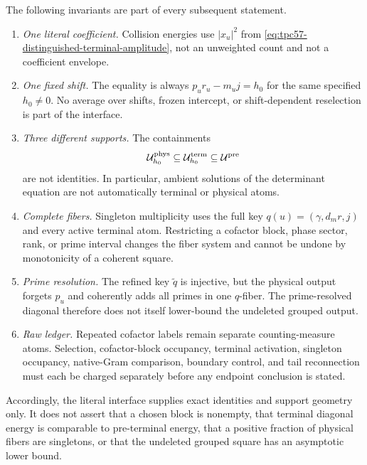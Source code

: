The following invariants are part of every subsequent statement.
\begin{enumerate}[label=\textup{(I\arabic*)},leftmargin=3.2em]
 \item \emph{One literal coefficient.}
       Collision energies use \(|x_u|^2\) from
       \eqref{eq:tpc57-distinguished-terminal-amplitude}, not an unweighted
       count and not a coefficient envelope.
 \item \emph{One fixed shift.}
       The equality is always \(p_ur_u-m_uj=h_0\) for the same specified
       \(h_0\ne0\).  No average over shifts, frozen intercept, or
       shift-dependent reselection is part of the interface.
 \item \emph{Three different supports.}
       The containments
       \[
        \mathcal U_{h_0}^{\rm phys}
        \subseteq\mathcal U_{h_0}^{\rm term}
        \subseteq\mathcal U^{\rm pre}
       \]
       are not identities.  In particular, ambient solutions of the
       determinant equation are not automatically terminal or physical
       atoms.
 \item \emph{Complete fibers.}
       Singleton multiplicity uses the full key
       \(q(u)=(\gamma,d_mr,j)\) and every active terminal atom.
       Restricting a cofactor block, phase sector, rank, or prime interval
       changes the fiber system and cannot be undone by monotonicity of a
       coherent square.
 \item \emph{Prime resolution.}
       The refined key \(\widetilde q\) is injective, but the physical output
       forgets \(p_u\) and coherently adds all primes in one \(q\)-fiber.
       The prime-resolved diagonal therefore does not itself lower-bound the
       undeleted grouped output.
 \item \emph{Raw ledger.}
       Repeated cofactor labels remain separate counting-measure atoms.
       Selection, cofactor-block occupancy, terminal activation, singleton
       occupancy, native-Gram comparison, boundary control, and tail
       reconnection must each be charged separately before any endpoint
       conclusion is stated.
\end{enumerate}

Accordingly, the literal interface supplies exact identities and support
geometry only.  It does not assert that a chosen block is nonempty, that
terminal diagonal energy is comparable to pre-terminal energy, that a
positive fraction of physical fibers are singletons, or that the undeleted
grouped square has an asymptotic lower bound.
